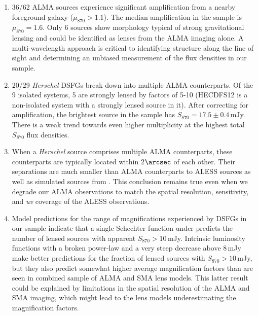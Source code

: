 \documentclass[iop]{emulateapj}
\begin{document}
\begin{enumerate}

    \item 36/62 ALMA sources experience significant amplification from a nearby
        foreground galaxy ($\mu_{870} > 1.1$).  The median amplification in the
        sample is $\mu_{870} = 1.6$.  Only 6 sources show morphology typical of
        strong gravitational lensing and could be identified as lenses from the
        ALMA imaging alone.  A multi-wavelength approach is critical to
        identifying structure along the line of sight and determining an
        unbiased measurement of the flux densities in our sample.

    \item 20/29 {\it Herschel} DSFGs break down into multiple ALMA
        counterparts.  Of the 9 isolated systems, 5 are strongly lensed by
        factors of 5-10 (HECDFS12 is a non-isolated system with a strongly
        lensed source in it).  After correcting for amplification, the brightest
        source in the sample has $S_{870} = 17.5 \pm 0.4\,$mJy.  There
        is a weak trend towards even higher multiplicity at the highest total
        $S_{870}$ flux densities.

    \item When a {\it Herschel} source comprises multiple ALMA counterparts,
        these counterparts are typically located within 2$\arcsec$ of each
        other.  Their separations are much smaller than ALMA counterparts to
        ALESS sources as well as simulated sources from \citet{HB13}.  This
        conclusion remains true even when we degrade our ALMA observations to
        match the spatial resolution, sensitivity, and {\it uv} coverage of the
        ALESS observations.

    \item Model predictions for the range of magnifications experienced by
        DSFGs in our sample indicate that a single Schechter function
        under-predicts the number of lensed sources with apparent $S_{870} >
        10\,$mJy.  Intrinsic luminosity functions with a broken power-law and a
        very steep decrease above 8$\,$mJy make better predictions for the
        fraction of lensed sources with $S_{870} > 10\,$mJy, but they also
        predict somewhat higher average magnification factors than are seen in
        combined sample of ALMA and SMA lens models.  This latter result could
        be explained by limitations in the spatial resolution of the ALMA and
        SMA imaging, which might lead to the lens models underestimating the
        magnification factors.  

\end{enumerate}
\end{document}
